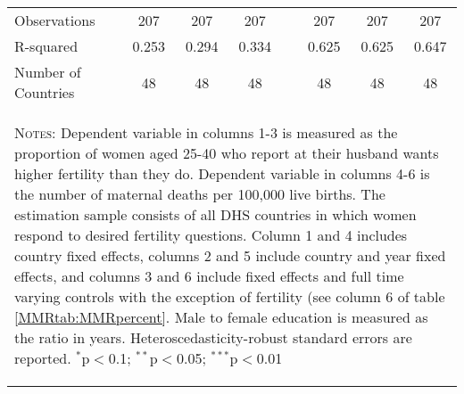 \begin{landscape}
\begin{table}[htpb!]
\begin{center}
\begin{tabular}{lcccp{1mm}ccc}
Observations            &207&207&207&&207&207&207\\ 
R-squared               &0.253&0.294&0.334                       &&0.625&0.625&0.647\\ 
Number of Countries     &48&48&48&&48&48&48\\ 
\midrule
\multicolumn{8}{p{15.4cm}}{\begin{footnotesize}\textsc{Notes:} Dependent variable in columns 1-3 is measured as the proportion of women aged 25-40 who report   at their husband wants higher fertility than they do.  Dependent variable in columns 4-6 is the number of maternal deaths per     100,000 live births.  The estimation sample consists of all DHS  countries in which women respond to desired fertility questions. Column 1 and 4 includes country  fixed effects, columns 2 and 5 include country and year fixed   effects, and columns 3 and 6 include fixed effects and full      time varying controls with the exception of fertility (see column 6 of table \ref{MMRtab:MMRpercent}.  Male to female education  is measured as the ratio in years.  Heteroscedasticity-robust    standard errors are reported.
$^{*}$p$<$0.1; $^{**}$p$<$0.05; $^{***}$p$<$0.01\end{footnotesize}} \\ \bottomrule 
\end{tabular}\end{center}\end{table}\end{landscape}